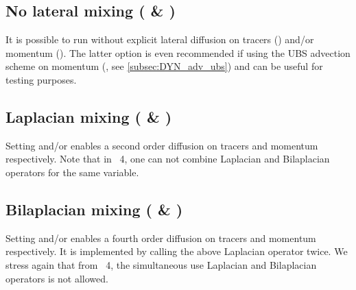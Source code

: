 \documentclass[../main/NEMO_manual]{subfiles}
\begin{document}
\subsection[No lateral mixing (\forcode{ln_traldf_OFF} \& \forcode{ln_dynldf_OFF})]{No lateral mixing (\protect{} \& \protect{})}

It is possible to run without explicit lateral diffusion on tracers (\protect{}) and/or
momentum (\protect{}). The latter option is even recommended if using the
UBS advection scheme on momentum (,
see \autoref{subsec:DYN_adv_ubs}) and can be useful for testing purposes.

\subsection[Laplacian mixing (\forcode{ln_traldf_lap} \& \forcode{ln_dynldf_lap})]{Laplacian mixing (\protect{} \& \protect{})}
Setting \protect{} and/or \protect{} enables
a second order diffusion on tracers and momentum respectively. Note that in \NEMO\ 4, one can not combine
Laplacian and Bilaplacian operators for the same variable.

\subsection[Bilaplacian mixing (\forcode{ln_traldf_blp} \& \forcode{ln_dynldf_blp})]{Bilaplacian mixing (\protect{} \& \protect{})}
Setting \protect{} and/or \protect{} enables
a fourth order diffusion on tracers and momentum respectively. It is implemented by calling the above Laplacian operator twice.
We stress again that from \NEMO\ 4, the simultaneous use Laplacian and Bilaplacian operators is not allowed.

\end{document}
